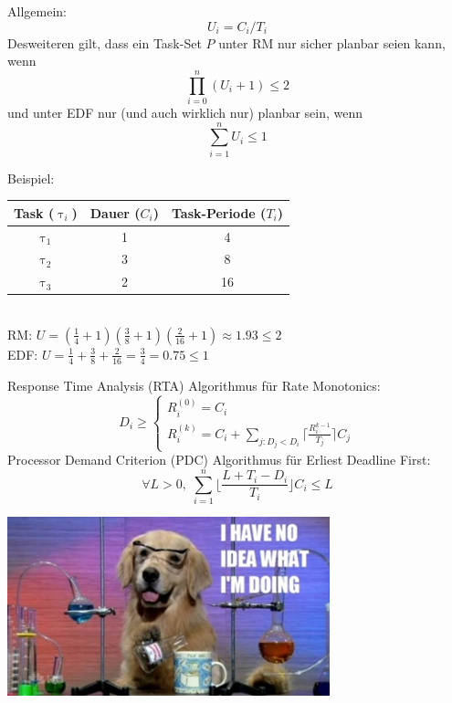 \begin{frame}{\subsecname}
	Allgemein:
	\begin{equation}
		U_i = C_i / T_i
	\end{equation}
	Desweiteren gilt, dass ein Task-Set $P$ unter RM nur sicher planbar seien kann, wenn
	\begin{equation}
		\prod_{i=0}^n (U_i +1) \leq 2
	\end{equation}
	und unter EDF nur (und auch wirklich nur) planbar sein, wenn
	\begin{equation}
		\sum_{i=1}^n U_i \leq 1
	\end{equation}
\end{frame}

\begin{frame}{\subsecname}
	Beispiel:
	\begin{tabular}{c||c|c}
		Task ($\uptau_i$) & Dauer ($C_i$) & Task-Periode ($T_i$)\\\hline\hline
		$\uptau_1$ & 1 & 4\\
		$\uptau_2$ & 3 & 8\\
		$\uptau_3$ & 2 & 16
	\end{tabular}$ $\\[3ex]\pause
		RM:  $U = (\frac{1}{4}+1)(\frac{3}{8}+1)(\frac{2}{16}+1)\approx 1.93 \leq 2$\\[3ex]\pause
		EDF: $U = \frac{1}{4} + \frac{3}{8} + \frac{2}{16} = \frac{3}{4} = 0.75 \leq 1$
\end{frame}

\begin{frame}{\subsecname}
	Response Time Analysis (RTA) Algorithmus für Rate Monotonics:
	\begin{equation}
		D_i \geq
		\begin{cases}
   				R_i^{(0)}=C_i \\
   				R_i^{(k)}=C_i+ \sum_{j:D_j<D_i} \lceil \frac{R_i^{k-1}}{T_j}\rceil C_j
  		\end{cases}
	\end{equation}
	Processor Demand Criterion (PDC) Algorithmus für Erliest Deadline First:
	\begin{equation}
		\forall L > 0,\; \sum_{i=1}^n\lfloor \frac{L+T_i-D_i}{T_i}\rfloor C_i \leq L
	\end{equation}
\end{frame}

\begin{frame}
	\begin{center}
		\includegraphics[width=0.7\textwidth]{graphics/memes/sciencedog.jpg}
	\end{center}
\end{frame}

